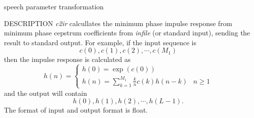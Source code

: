 % 
% 
% 
% 
%                                                                        
%
%
{speech parameter transformation}

\begin{synopsis}
 \item[c2ir] [ --l $L$ ] [ --m $M_1$ ] [ --M $M_2$ ] [ --i ] [ {\em infile} ]
\end{synopsis}

\begin{qsection}{DESCRIPTION}
{\em c2ir} calcullates the minimum phase impulse response 
from minimum phase cepstrum coefficients 
from {\em infile} (or standard input), 
sending the result to standard output.
For example, if the input sequence is
\[c(0),c(1),c(2),\cdots,c(M_1)\]
then the impulse response is calculated as
\[ h(n)=\left\{
\begin{array}{lc}
 h(0)=\exp(c(0))&\\
 h(n)=\displaystyle \sum_{k=1}^{M_1} \frac{k}{n}c(k)h(n-k)& n \geq 1
\end{array}
\right. \]
and the output will contain
\[ h(0),h(1),h(2),\cdots,h(L -1). \]
The format of input and output format is float.
\end{qsection}

